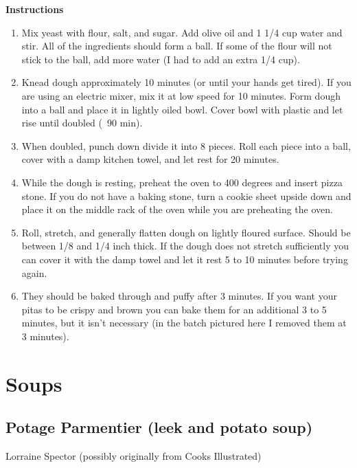 \documentclass{article}
\numberwithin{figure}{section}
\numberwithin{equation}{section}
\begin{document}
{\bf Instructions}
\begin{enumerate}
\item Mix yeast with flour, salt, and sugar.  Add olive oil and 1 1/4 cup water and stir.  All of the ingredients should form a ball. If some of the flour will not stick to the ball, add more water (I had to add an extra 1/4 cup). 

\item Knead dough approximately 10 minutes (or until your hands get tired). If you are using an electric mixer, mix it at low speed for 10 minutes.  Form dough into a ball and place it in lightly oiled bowl.  Cover bowl with plastic and let rise until doubled (~90 min).

\item When doubled, punch down divide it into 8 pieces. Roll each piece into a ball, cover with a damp kitchen towel, and let rest for 20 minutes.

\item While the dough is resting, preheat the oven to 400 degrees and insert pizza stone. If you do not have a baking stone, turn a cookie sheet upside down and place it on the middle rack of the oven while you are preheating the oven.

\item Roll, stretch, and generally flatten dough on lightly floured surface. Should be between 1/8 and 1/4 inch thick. If the dough does not stretch sufficiently you can cover it with the damp towel and let it rest 5 to 10 minutes before trying again.

\item They should be baked through and puffy after 3 minutes. If you want your pitas to be crispy and brown you can bake them for an additional 3 to 5 minutes, but it isn't necessary (in the batch pictured here I removed them at 3 minutes).
\end{enumerate}

\pagebreak
\section{Soups}

\pagebreak
\subsection{Potage Parmentier (leek and potato soup)}
Lorraine Spector (possibly originally from Cooks Illustrated)\\
\end{document}
